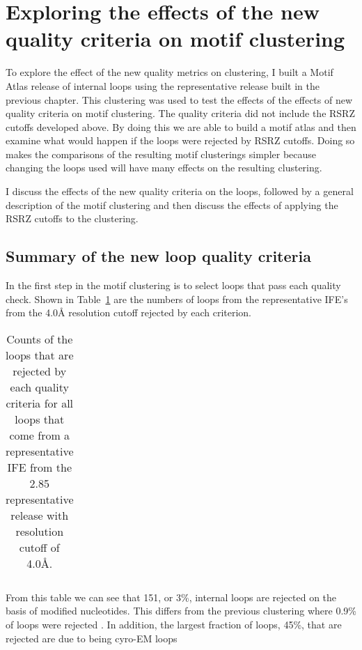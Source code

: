 \section{Exploring the effects of the new quality criteria on motif clustering}

To explore the effect of the new quality metrics on clustering, I built a Motif
Atlas release of internal loops using the representative release built in the
previous chapter. This clustering was used to test the effects of the effects of
new quality criteria on motif clustering. The quality criteria did not include
the RSRZ cutoffs developed above. By doing this we are able to build a motif
atlas and then examine what would happen if the loops were rejected by RSRZ
cutoffs. Doing so makes the comparisons of the resulting motif clusterings
simpler because changing the loops used will have many effects on the resulting
clustering.

I discuss the effects of the new quality criteria on the loops, followed by a
general description of the motif clustering and then discuss the effects of
applying the RSRZ cutoffs to the clustering. 

\subsection{Summary of the new loop quality criteria}

In the first step in the motif clustering is to select loops that pass each
quality check. Shown in Table~\ref{tab:current-loop-quality} are the numbers of
loops from the representative IFE’s from the 4.0{\AA} resolution cutoff rejected by
each criterion.

\begin{table}
  \begin{tabular}{lr}
    \toprule
    \midrule
    \bottomrule
  \end{tabular}
  \caption{Counts of the loops that are rejected by each quality criteria for
  all loops that come from a representative IFE from the 2.85 representative
  release with resolution cutoff of 4.0{\AA}.}
  \label{tab:current-loop-quality}
\end{table}

From this table we can see that 151, or 3\%, internal loops are rejected on the
basis of modified nucleotides. This differs from the previous clustering where
0.9\% of loops were rejected \cite{Petrov2012}. In addition, the largest
fraction of loops, 45\%, that are rejected are due to being cyro-EM loops

